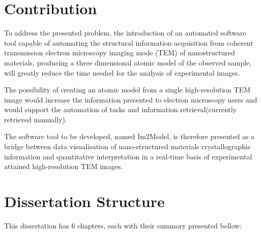 \documentclass[
  oneside,
  11pt, a4paper,
  footinclude=true,
  headinclude=true,
  cleardoublepage=empty
]{scrbook}
\begin{document}
	\section{Contribution}
	
	To address the presented problem, the introduction of an automated software tool capable of automating the structural information acquisition from coherent transmission electron microscopy imaging mode (TEM) of nanostructured materials, producing a three dimensional atomic model of the observed sample, will greatly reduce the time needed for the analysis of experimental images.\par 
	
	The possibility of creating an atomic model from a single high-resolution TEM image would increase the information presented to electron microscopy users and would support the automation of tasks and information retrieval(currently retrieved manually).\par 
	
	The software tool to be developed, named Im2Model, is therefore presented as a bridge between data visualisation of nano-structured materials crystallographic information and quantitative interpretation in a real-time basis of experimental attained high-resolution TEM images.
	



	\section{Dissertation Structure}
		

This dissertation has 6 chapters, each with their summary presented bellow:
\end{document}
